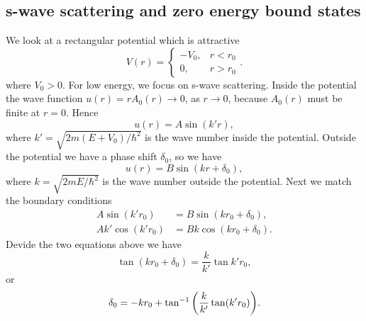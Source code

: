\documentclass[10pt]{article}
\begin{document}
\subsection{s-wave scattering and zero energy bound states}
We look at a rectangular potential which is attractive
\begin{equation}
	V(r) =
	\begin{cases}
			-V_0,& r<r_0 \\
			0,& r>r_0
	\end{cases}.
\end{equation}
where $V_0 >0$. For low energy, we focus on s-wave scattering. Inside the potential the wave function $u(r) = r A_0(r) \to 0$, as $r\to 0$, because $A_0(r)$ must be finite at $r = 0$. Hence
\begin{equation}
	u(r) = A \sin(k'r),
\end{equation}
where $k' = \sqrt{2m(E+V_0)/\hbar^2}$ is the wave number inside the potential. Outside the potential we have a phase shift $\delta_0$, so we have
\begin{equation}
	u(r) = B \sin(kr + \delta_0),
\end{equation}
where $k = \sqrt{2mE/\hbar^2}$ is the wave number outside the potential. Next we match the boundary conditions
\begin{align*}
	A \sin(k'r_0) &= B \sin(kr_0 + \delta_0), \\
	A k' \cos(k' r_0) &= B k \cos(kr_0 + \delta_0).
\end{align*}
Devide the two equations above we have
\begin{equation}
	\tan(kr_0 + \delta_0) = \frac{k}{k'} \tan{k' r_0},
\end{equation}
or
\begin{equation}
	\delta_0 = -kr_0 + \tan^{-1}\qty(\frac{k}{k'}\tan(k'r_0)).
\end{equation}
\end{document}
